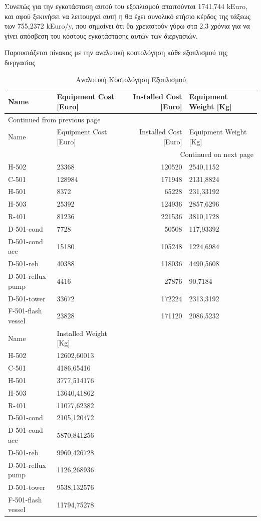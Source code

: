 \documentclass[11pt]{article}
\begin{document}
Συνεπώς για την εγκατάσταση αυτού του εξοπλισμού απαιτούνται 1741,744
kEuro, και αφού ξεκινήσει να λειτουργεί αυτή η θα έχει συνολικό ετήσιο
κέρδος της τάξεως των 755,2372 kEuro/y, που σημαίνει ότι θα χρειαστούν
γύρω στα 2,3 χρόνια για να γίνει απόσβεση του κόστους εγκατάστασης αυτών
των διεργασιών.

Παρουσιάζεται πίνακας με την αναλυτική κοστολόγηση κάθε εξοπλισμού της
διεργασίας

\begin{longtable}{llrl}
\caption{Αναλυτική Κοστολόγηση Εξοπλισμού}
\\
\hline
Name & Equipment Cost [Euro] & Installed Cost [Euro] & Equipment Weight [Kg]\\
\hline
\endfirsthead
\multicolumn{4}{l}{Continued from previous page} \\
\hline

Name & Equipment Cost [Euro] & Installed Cost [Euro] & Equipment Weight [Kg] \\

\hline
\endhead
\hline\multicolumn{4}{r}{Continued on next page} \\
\endfoot
\endlastfoot
\hline
H-502 & 23368 & 120520 & 2540,1152\\
C-501 & 128984 & 171948 & 2131,8824\\
H-501 & 8372 & 65228 & 231,33192\\
H-503 & 25392 & 124936 & 2857,6296\\
R-401 & 81236 & 221536 & 3810,1728\\
D-501-cond & 7728 & 50508 & 117,93392\\
D-501-cond acc & 15180 & 105248 & 1224,6984\\
D-501-reb & 40388 & 118036 & 4490,5608\\
D-501-reflux pump & 4416 & 27876 & 90,7184\\
D-501-tower & 33672 & 172224 & 2313,3192\\
F-501-flash vessel & 23828 & 171120 & 2086,5232\\
\hline
Name & Installed Weight [Kg] &  & \\
\hline
H-502 & 12602,60013 &  & \\
C-501 & 4186,65416 &  & \\
H-501 & 3777,514176 &  & \\
H-503 & 13640,41862 &  & \\
R-401 & 11077,62382 &  & \\
D-501-cond & 2105,120472 &  & \\
D-501-cond acc & 5870,841256 &  & \\
D-501-reb & 9960,426728 &  & \\
D-501-reflux pump & 1126,268936 &  & \\
D-501-tower & 9538,132576 &  & \\
F-501-flash vessel & 11794,75278 &  & \\
\hline
\end{longtable}
\end{document}
